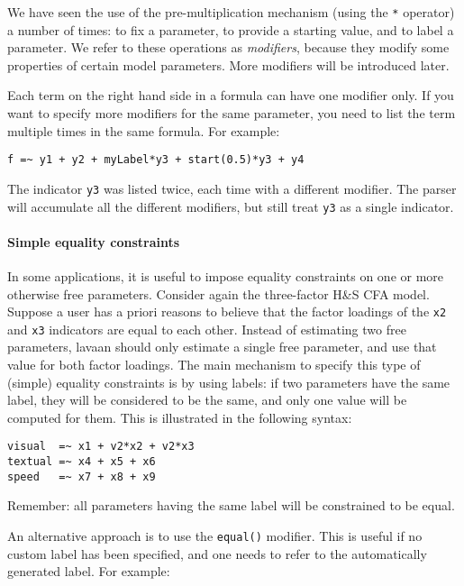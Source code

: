 We have seen the use of the pre-multiplication mechanism (using the
\texttt{*} operator) a number of times: to fix a parameter, to provide a
starting value, and to label a parameter. We refer to these operations
as \emph{modifiers}, because they modify some properties of certain
model parameters. More modifiers will be introduced later.

Each term on the right hand side in a formula can have one modifier
only. If you want to specify more modifiers for the same parameter, you
need to list the term multiple times in the same formula. For example:

\begin{verbatim}
f =~ y1 + y2 + myLabel*y3 + start(0.5)*y3 + y4
\end{verbatim}

The indicator \texttt{y3} was listed twice, each time with a different
modifier. The parser will accumulate all the different modifiers, but
still treat \texttt{y3} as a single indicator.

\hypertarget{simple-equality-constraints}{%
\paragraph{Simple equality
constraints}\label{simple-equality-constraints}}

In some applications, it is useful to impose equality constraints on one
or more otherwise free parameters. Consider again the three-factor H\&S
CFA model. Suppose a user has a priori reasons to believe that the
factor loadings of the \texttt{x2} and \texttt{x3} indicators are equal
to each other. Instead of estimating two free parameters, lavaan should
only estimate a single free parameter, and use that value for both
factor loadings. The main mechanism to specify this type of (simple)
equality constraints is by using labels: if two parameters have the same
label, they will be considered to be the same, and only one value will
be computed for them. This is illustrated in the following syntax:

\begin{verbatim}
visual  =~ x1 + v2*x2 + v2*x3
textual =~ x4 + x5 + x6
speed   =~ x7 + x8 + x9
\end{verbatim}

Remember: all parameters having the same label will be constrained to be
equal.

An alternative approach is to use the \texttt{equal()} modifier. This is
useful if no custom label has been specified, and one needs to refer to
the automatically generated label. For example:

